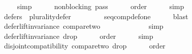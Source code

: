 \begin{isabellebody}
\ \ \ \ \isamarkupfalse%
\ simp\ \isanewline
\ \ \isamarkupfalse%
\ {}{}{}{}{\isacharcolon}{\kern0pt}\ {\isachardoublequoteopen}non{\isacharunderscore}{\kern0pt}blocking\ {\isacharquery}{\kern0pt}pass{}{\isachardoublequoteclose}\isanewline
\ \ \ \ \isamarkupfalse%
\ order\isanewline
\ \ \ \ \isamarkupfalse%
\ simp\ \isanewline
\ \ \isamarkupfalse%
\ {}{}{}{}{\isacharcolon}{\kern0pt}\ {\isachardoublequoteopen}defers\ {}\ {\isacharquery}{\kern0pt}plurality{\isacharunderscore}{\kern0pt}defer{\isachardoublequoteclose}\isanewline
\ \ \ \ \isamarkupfalse%
\ {}{}{}{}{}\ {}{}{}{}{}\ {}{}{}{}{}\ seq{\isacharunderscore}{\kern0pt}comp{\isacharunderscore}{\kern0pt}def{\isacharunderscore}{\kern0pt}one\isanewline
\ \ \ \ \isamarkupfalse%
\ blast\isanewline
\isanewline
\ \ \isamarkupfalse%
\ {}{}{}{\isacharcolon}{\kern0pt}\ {\isachardoublequoteopen}defer{\isacharunderscore}{\kern0pt}lift{\isacharunderscore}{\kern0pt}invariance\ {\isacharquery}{\kern0pt}compare{\isacharunderscore}{\kern0pt}two{\isachardoublequoteclose}\isanewline
\ \ \ \ \isamarkupfalse%
\ {}{}{}{}\ {}{}{}{}\isanewline
\ \ \ \ \isamarkupfalse%
\ simp\ \isanewline
\ \ \isamarkupfalse%
\ {}{}{}{\isacharcolon}{\kern0pt}\ {\isachardoublequoteopen}defer{\isacharunderscore}{\kern0pt}lift{\isacharunderscore}{\kern0pt}invariance\ {\isacharquery}{\kern0pt}drop{}{\isachardoublequoteclose}\isanewline
\ \ \ \ \isamarkupfalse%
\ order\isanewline
\ \ \ \ \isamarkupfalse%
\ simp\ \isanewline
\ \ \isamarkupfalse%
\ {}{}{}{\isacharcolon}{\kern0pt}\ {\isachardoublequoteopen}disjoint{\isacharunderscore}{\kern0pt}compatibility\ {\isacharquery}{\kern0pt}compare{\isacharunderscore}{\kern0pt}two\ {\isacharquery}{\kern0pt}drop{}{\isachardoublequoteclose}\isanewline
\ \ \ \ \isamarkupfalse%
\ order\ {}{}{}{}\isanewline

\end{isabellebody}
